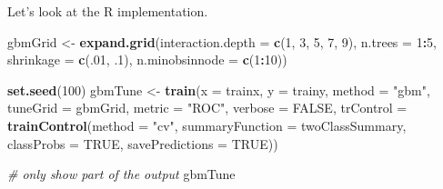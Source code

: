 \documentclass[12pt,]{krantz}
\makeatletter
\newenvironment{Shaded}{\begin{snugshade}}{\end{snugshade}}
\newcommand{\CommentTok}[1]{\textcolor[rgb]{0.37,0.37,0.37}{\textit{#1}}}
\newcommand{\DataTypeTok}[1]{\textcolor[rgb]{0.27,0.27,0.27}{#1}}
\newcommand{\DecValTok}[1]{\textcolor[rgb]{0.06,0.06,0.06}{#1}}
\newcommand{\FloatTok}[1]{\textcolor[rgb]{0.06,0.06,0.06}{#1}}
\newcommand{\KeywordTok}[1]{\textcolor[rgb]{0.27,0.27,0.27}{\textbf{#1}}}
\newcommand{\NormalTok}[1]{#1}
\newcommand{\OperatorTok}[1]{\textcolor[rgb]{0.43,0.43,0.43}{\textbf{#1}}}
\newcommand{\OtherTok}[1]{\textcolor[rgb]{0.37,0.37,0.37}{#1}}
\newcommand{\StringTok}[1]{\textcolor[rgb]{0.5,0.5,0.5}{#1}}
\newenvironment{kframe}{%
\medskip{}
\setlength{\fboxsep}{.8em}
 \def\at@end@of@kframe{}%
 \ifinner\ifhmode%
  \def\at@end@of@kframe{\end{minipage}}%
  \begin{minipage}{\columnwidth}%
 \fi\fi%
 \def\FrameCommand##1{\hskip\@totalleftmargin \hskip-\fboxsep
 \colorbox{shadecolor}{##1}\hskip-\fboxsep
     \hskip-\linewidth \hskip-\@totalleftmargin \hskip\columnwidth}%
 \MakeFramed {\advance\hsize-\width
   \@totalleftmargin\z@ \linewidth\hsize
   \@setminipage}}%
 {\par\unskip\endMakeFramed%
 \at@end@of@kframe}
\renewenvironment{Shaded}{\begin{kframe}}{\end{kframe}}
\makeatother
\begin{document}
Let's look at the R implementation.

\begin{Shaded}
\begin{Highlighting}[]
\NormalTok{gbmGrid <-}\StringTok{ }\KeywordTok{expand.grid}\NormalTok{(}\DataTypeTok{interaction.depth =} \KeywordTok{c}\NormalTok{(}\DecValTok{1}\NormalTok{, }\DecValTok{3}\NormalTok{, }\DecValTok{5}\NormalTok{, }\DecValTok{7}\NormalTok{, }\DecValTok{9}\NormalTok{),}
                       \DataTypeTok{n.trees =} \DecValTok{1}\OperatorTok{:}\DecValTok{5}\NormalTok{,}
                       \DataTypeTok{shrinkage =} \KeywordTok{c}\NormalTok{(.}\DecValTok{01}\NormalTok{, }\FloatTok{.1}\NormalTok{),}
                       \DataTypeTok{n.minobsinnode =} \KeywordTok{c}\NormalTok{(}\DecValTok{1}\OperatorTok{:}\DecValTok{10}\NormalTok{))}

\KeywordTok{set.seed}\NormalTok{(}\DecValTok{100}\NormalTok{)}
\NormalTok{gbmTune <-}\StringTok{ }\KeywordTok{train}\NormalTok{(}\DataTypeTok{x =}\NormalTok{ trainx, }
                \DataTypeTok{y =}\NormalTok{ trainy,}
                \DataTypeTok{method =} \StringTok{"gbm"}\NormalTok{,}
                \DataTypeTok{tuneGrid =}\NormalTok{ gbmGrid,}
                \DataTypeTok{metric =} \StringTok{"ROC"}\NormalTok{,}
                \DataTypeTok{verbose =} \OtherTok{FALSE}\NormalTok{,}
                \DataTypeTok{trControl =} \KeywordTok{trainControl}\NormalTok{(}\DataTypeTok{method =} \StringTok{"cv"}\NormalTok{,}
                           \DataTypeTok{summaryFunction =}\NormalTok{ twoClassSummary,}
                           \DataTypeTok{classProbs =} \OtherTok{TRUE}\NormalTok{,}
                           \DataTypeTok{savePredictions =} \OtherTok{TRUE}\NormalTok{))}
\end{Highlighting}
\end{Shaded}

\begin{Shaded}
\begin{Highlighting}[]
\CommentTok{# only show part of the output}
\NormalTok{gbmTune}
\end{Highlighting}
\end{Shaded}
\end{document}
